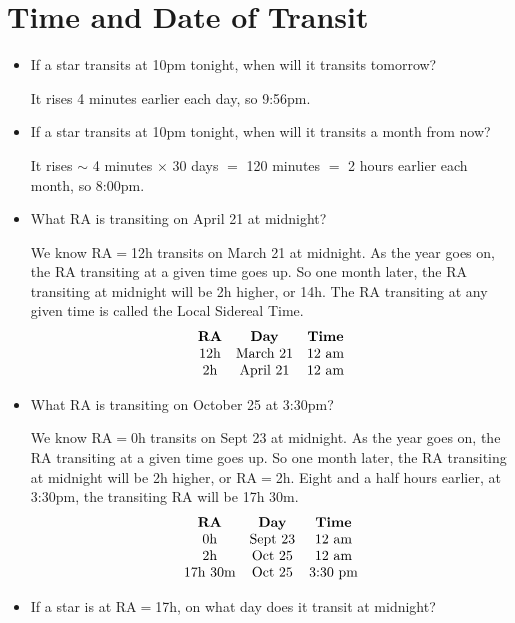 \documentclass[12pt, preprint]{aastex}
\begin{document}
\newcommand{\degree}{\ensuremath{{}^\circ}}

\section{Time and Date of Transit}

\begin{itemize}
\item If a star transits at 10pm tonight, when will it transits tomorrow?

  \begin{answer}
    It rises 4 minutes earlier each day, so 9:56pm.
  \end{answer}
\item If a star transits at 10pm tonight, when will it transits a month from
  now?

  \begin{answer}
    It rises $\sim$ 4 minutes $\times$ 30 days $=$ 120 minutes $=$ 2
    hours earlier each month, so 8:00pm.
  \end{answer}
\item What RA is transiting on April 21 at midnight?

  \begin{answer}
    We know RA$=$12h transits on March 21 at midnight. As the year
    goes on, the RA transiting at a given time goes up. So one month
    later, the RA transiting at midnight will be 2h higher, or
    14h. The RA transiting at any given time is called the Local
    Sidereal Time.
    \begin{equation}
    \begin{array}{ccc}
      \mbox{\bf RA} & \mbox{\bf Day} & \mbox{\bf Time} \cr
      \mbox{12h} & \mbox{March 21} & \mbox{12 am}\cr
      \mbox{2h} & \mbox{April 21}  & \mbox{12 am}\cr
    \end{array}
    \end{equation}
  \end{answer}
\item What RA is transiting on October 25 at 3:30pm?

  \begin{answer}
    We know RA$=$0h transits on Sept 23 at midnight. As the year
    goes on, the RA transiting at a given time goes up. So one month
    later, the RA transiting at midnight will be 2h higher, or
    RA$=$2h. Eight and a half hours earlier, at 3:30pm, the transiting
    RA will be 17h 30m.
    \begin{equation}
    \begin{array}{ccc}
      \mbox{\bf RA} & \mbox{\bf Day} & \mbox{\bf Time} \cr
      \mbox{0h} & \mbox{Sept 23} & \mbox{12 am}\cr
      \mbox{2h} & \mbox{Oct 25}  & \mbox{12 am}\cr
      \mbox{17h 30m} & \mbox{Oct 25}  & \mbox{3:30 pm}\cr
    \end{array}
    \end{equation}
  \end{answer}
\item If a star is at RA$=$17h, on what day does it transit at midnight?


\end{itemize}
\end{document}
